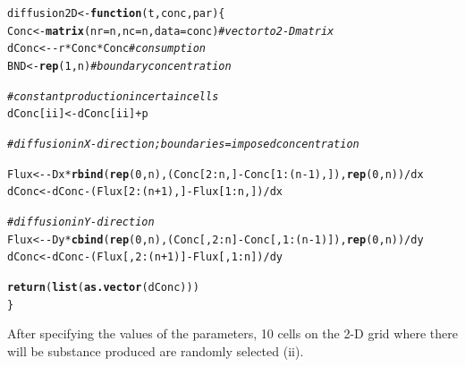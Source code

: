 \documentclass{tufte-handout}\usepackage[]{graphicx}\usepackage[]{xcolor}
\makeatletter
\newcommand{\hlnum}[1]{\textcolor[rgb]{0.686,0.059,0.569}{#1}}%
\newcommand{\hlcom}[1]{\textcolor[rgb]{0.678,0.584,0.686}{\textit{#1}}}%
\newcommand{\hlopt}[1]{\textcolor[rgb]{0,0,0}{#1}}%
\newcommand{\hlstd}[1]{\textcolor[rgb]{0.345,0.345,0.345}{#1}}%
\newcommand{\hlkwa}[1]{\textcolor[rgb]{0.161,0.373,0.58}{\textbf{#1}}}%
\newcommand{\hlkwb}[1]{\textcolor[rgb]{0.69,0.353,0.396}{#1}}%
\newcommand{\hlkwc}[1]{\textcolor[rgb]{0.333,0.667,0.333}{#1}}%
\newcommand{\hlkwd}[1]{\textcolor[rgb]{0.737,0.353,0.396}{\textbf{#1}}}%
\newenvironment{kframe}{%
 \def\at@end@of@kframe{}%
 \ifinner\ifhmode%
  \def\at@end@of@kframe{\end{minipage}}%
  \begin{minipage}{\columnwidth}%
 \fi\fi%
 \def\FrameCommand##1{\hskip\@totalleftmargin \hskip-\fboxsep
 \colorbox{shadecolor}{##1}\hskip-\fboxsep
     \hskip-\linewidth \hskip-\@totalleftmargin \hskip\columnwidth}%
 \MakeFramed {\advance\hsize-\width
   \@totalleftmargin\z@ \linewidth\hsize
   \@setminipage}}%
 {\par\unskip\endMakeFramed%
 \at@end@of@kframe}
\newenvironment{knitrout}{}{} %
\makeatother
\begin{document}
\begin{knitrout}
\color{fgcolor}\begin{kframe}
\begin{alltt}
\hlstd{diffusion2D} \hlkwb{<-} \hlkwa{function}\hlstd{(}\hlkwc{t}\hlstd{,}\hlkwc{conc}\hlstd{,}\hlkwc{par}\hlstd{)\{}
\hlstd{Conc} \hlkwb{<-} \hlkwd{matrix}\hlstd{(}\hlkwc{nr}\hlstd{=n,}\hlkwc{nc}\hlstd{=n,}\hlkwc{data}\hlstd{=conc)} \hlcom{# vector to 2-D matrix}
\hlstd{dConc} \hlkwb{<-} \hlopt{-}\hlstd{r}\hlopt{*}\hlstd{Conc}\hlopt{*}\hlstd{Conc} \hlcom{# consumption}
\hlstd{BND} \hlkwb{<-} \hlkwd{rep}\hlstd{(}\hlnum{1}\hlstd{,n)} \hlcom{# boundary concentration}

\hlcom{# constant production in certain cells}
\hlstd{dConc[ii]}\hlkwb{<-} \hlstd{dConc[ii]}\hlopt{+} \hlstd{p}

\hlcom{#diffusion in X-direction; boundaries=imposed concentration}

\hlstd{Flux} \hlkwb{<-} \hlopt{-}\hlstd{Dx} \hlopt{*} \hlkwd{rbind}\hlstd{(}\hlkwd{rep}\hlstd{(}\hlnum{0}\hlstd{,n),(Conc[}\hlnum{2}\hlopt{:}\hlstd{n,]}\hlopt{-}\hlstd{Conc[}\hlnum{1}\hlopt{:}\hlstd{(n}\hlopt{-}\hlnum{1}\hlstd{),]),}\hlkwd{rep}\hlstd{(}\hlnum{0}\hlstd{,n))}\hlopt{/}\hlstd{dx}
\hlstd{dConc} \hlkwb{<-} \hlstd{dConc} \hlopt{-} \hlstd{(Flux[}\hlnum{2}\hlopt{:}\hlstd{(n}\hlopt{+}\hlnum{1}\hlstd{),]}\hlopt{-}\hlstd{Flux[}\hlnum{1}\hlopt{:}\hlstd{n,])}\hlopt{/}\hlstd{dx}

\hlcom{#diffusion in Y-direction}
\hlstd{Flux} \hlkwb{<-} \hlopt{-}\hlstd{Dy} \hlopt{*} \hlkwd{cbind}\hlstd{(}\hlkwd{rep}\hlstd{(}\hlnum{0}\hlstd{,n),(Conc[,}\hlnum{2}\hlopt{:}\hlstd{n]}\hlopt{-}\hlstd{Conc[,}\hlnum{1}\hlopt{:}\hlstd{(n}\hlopt{-}\hlnum{1}\hlstd{)]),}\hlkwd{rep}\hlstd{(}\hlnum{0}\hlstd{,n))}\hlopt{/}\hlstd{dy}
\hlstd{dConc} \hlkwb{<-} \hlstd{dConc} \hlopt{-} \hlstd{(Flux[,}\hlnum{2}\hlopt{:}\hlstd{(n}\hlopt{+}\hlnum{1}\hlstd{)]}\hlopt{-}\hlstd{Flux[,}\hlnum{1}\hlopt{:}\hlstd{n])}\hlopt{/}\hlstd{dy}

\hlkwd{return}\hlstd{(}\hlkwd{list}\hlstd{(}\hlkwd{as.vector}\hlstd{(dConc)))}
\hlstd{\}}
\end{alltt}
\end{kframe}
\end{knitrout}

After specifying the values of the parameters, 10 cells on the 2-D grid where there will be
substance produced are randomly selected (ii).
\end{document}
